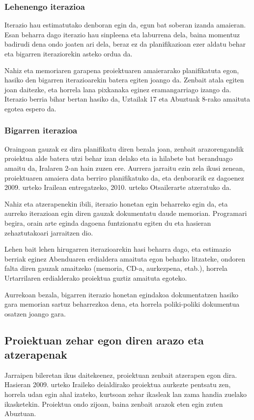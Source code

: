 \subsubsection{Lehenengo iterazioa}
Iterazio hau estimatutako denboran egin da, egun bat soberan izanda amaieran. Esan beharra dago iterazio hau sinpleena eta laburrena dela, baina momentuz badirudi dena ondo joaten ari dela, beraz ez da planifikazioan ezer aldatu behar eta bigarren iteraziorekin asteko ordua da.

Nahiz eta memoriaren garapena proiektuaren amaierarako planifikatuta egon, hasiko den bigarren iterazioarekin batera egiten joango da. Zenbait atala egiten joan daitezke, eta horrela lana pixkanaka eginez eramangarriago izango da. Iterazio berria bihar bertan hasiko da, Uztailak 17 eta Abuztuak 8-rako amaituta egotea espero da.

\subsubsection{Bigarren iterazioa}
Oraingoan gauzak ez dira planifikatu diren bezala joan, zenbait arazorengandik proiektua alde batera utzi behar izan delako eta ia hilabete bat beranduago amaitu da, Iralaren 2-an hain zuzen ere. Aurrera jarraitu ezin zela ikusi zenean, proiektuaren amaiera data berriro planifikatuko da, eta denborarik ez dagoenez 2009. urteko Irailean entregatzeko, 2010. urteko Otsailerarte atzeratuko da.

Nahiz eta atzerapenekin ibili, iterazio honetan egin beharreko egin da, eta aurreko iterazioan egin diren gauzak dokumentatu daude memorian. Programari begira, orain arte eginda dagoena funtzionatu egiten du eta hasieran zehaztutakoari jarraitzen dio.

Lehen bait lehen hirugarren iterazioarekin hasi beharra dago, eta estimazio berriak eginez Abenduaren erdialdera amaituta egon beharko litzateke, ondoren falta diren gauzak amaitzeko (memoria, CD-a, aurkezpena, etab.), horrela Urtarrilaren erdialderako proiektua guztiz amaituta egoteko.

Aurrekoan bezala, bigarren iterazio honetan egindakoa dokumentatzen hasiko gara memorian sartuz beharrezkoa dena, eta horrela poliki-poliki dokumentua osatzen joango gara.

\subsection{Proiektuan zehar egon diren arazo eta atzerapenak}
Jarraipen bileretan ikus daitekeenez, proiektuan zenbait atzerapen egon dira. Hasieran 2009. urteko Iraileko deialdirako proiektua aurkezte pentsatu zen, horrela udan egin ahal izateko, kurtsoan zehar ikasleak lan zama handia zuelako ikasketekin. Proiektua ondo zijoan, baina zenbait arazok eten egin zuten Abuztuan.

